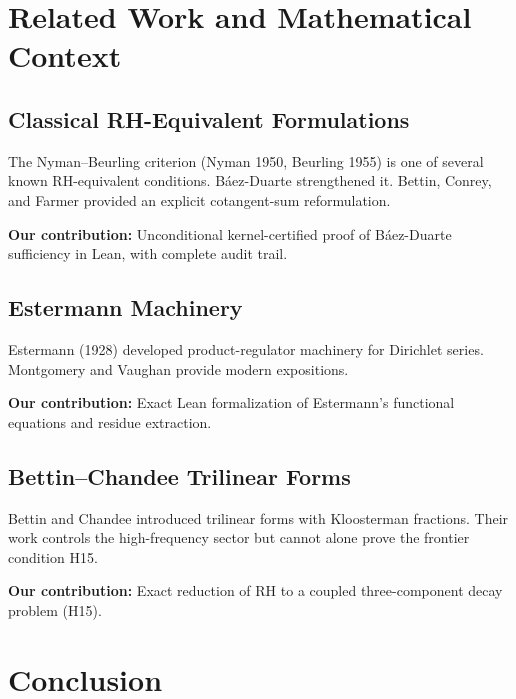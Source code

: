 \documentclass[11pt,a4paper]{article}
\theoremstyle{plain}
\theoremstyle{definition}
\theoremstyle{remark}
\begin{document}
\section{Related Work and Mathematical Context}
\label{sec:related}

\subsection{Classical RH-Equivalent Formulations}

The Nyman--Beurling criterion (Nyman 1950, Beurling 1955) is one of several known RH-equivalent conditions. Báez-Duarte \cite{BaezDuarte2003} strengthened it. Bettin, Conrey, and Farmer \cite{BettinConreyFarmer2020} provided an explicit cotangent-sum reformulation.

\textbf{Our contribution:} Unconditional kernel-certified proof of Báez-Duarte sufficiency in Lean, with complete audit trail.

\subsection{Estermann Machinery}

Estermann (1928) developed product-regulator machinery for Dirichlet series. Montgomery and Vaughan \cite{MontgomeryVaughan2007} provide modern expositions.

\textbf{Our contribution:} Exact Lean formalization of Estermann's functional equations and residue extraction.

\subsection{Bettin--Chandee Trilinear Forms}

Bettin and Chandee \cite{BettinChandee2015} introduced trilinear forms with Kloosterman fractions. Their work controls the high-frequency sector but cannot alone prove the frontier condition H15.

\textbf{Our contribution:} Exact reduction of RH to a coupled three-component decay problem (H15).

\section{Conclusion}
\label{sec:conclusion}
\end{document}
